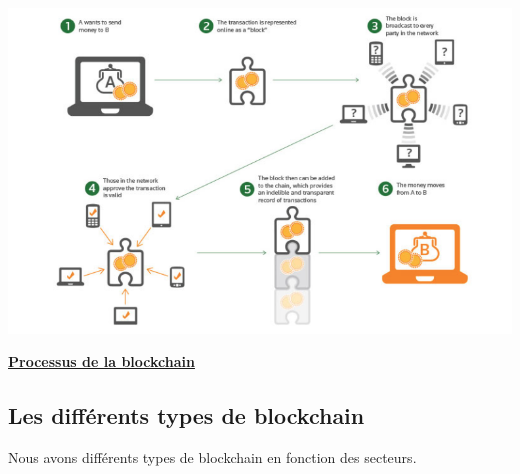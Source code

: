 \documentclass[12pt]{report}
\begin{document}
\begin{center}
    \includegraphics[width=1\textwidth]{blockchain-explained.png}

    \textbf{\underline{Processus de la blockchain}} \\[1cm]
\end{center}


	\subsection{Les différents types de blockchain}
\hspace{1cm} Nous avons différents types de blockchain en fonction des secteurs. 
\end{document}
